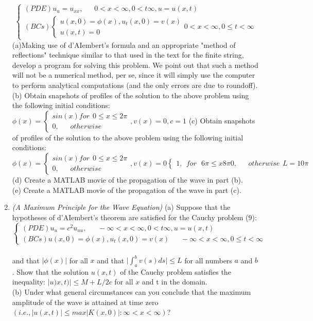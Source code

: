 \documentclass[../main.tex]{subfiles}
\begin{document}
\begin{enumerate}
$$\begin{cases} 
	(PDE) u_u=u_{xx}, ~~~~~~~ 0< x< \infty, 0<t \infty , u=u(x,t) \\ 
	(BCs)
	\begin{cases} 
	u(x,0)=\phi (x), u_t(x,0)=v(x)\\
	u(x,t)=0
	\end{cases}
	0<x<\infty, 0\leqslant t< \infty 
\end{cases}$$
(a)Making use of d'AIembert's formula and an appropriate "method of reflections" technique 
similar to that used in the text for the finite string, develop a program for solving this problem. 
We point out that such a method will not be a numerical method, per se, since it will simply use 
the computer to perform analytical computations (and the only errors are due to roundoff). 
\\
(b) Obtain snapshots of profiles of the solution to the above problem using the following initial conditions:
$\phi(x)=
\begin{cases}
	sin(x) for~~ 0\leqslant x \leqslant2 \pi\\
	0, ~~~~~~~otherwise
\end{cases},
	v(x)=0, c=1$
(c) Obtain snapshots of profiles of the solution to the above problem using the following initial 
conditions:
$$\phi(x)=
\begin{cases}
	sin(x) for~~ 0\leqslant x \leqslant2 \pi\\
	0, ~~~~~~~otherwise
\end{cases},
	v(x)=0
	 \begin{cases}
	 	1,~~for ~~~6\pi \leqslant x 8\pi
	 	0,~~~~~~~otherwise
	 \end{cases}
	 	L=10\pi$$
(d) Create a MATLAB movie of the propagation of the wave in part (b). 
\\
(e) Create a MATLAB movie of the propagation of the wave in part (c).
\\
	\item
		\textit{(A Maximum Principle for the Wave Equation)} (a) Suppose that the hypotheses of d'AIembert's 
theorem are satisfied for the Cauchy problem (9): 
$$\begin{cases} 
	(PDE) u_u=c^2 u_{uu}, ~~~~~~~ - \infty< x< \infty, 0<t \infty , u=u(x,t) \\ 
	(BCs) u(x,0)=\phi (x), u_t(x,0)=v(x) ~~~~~~~
	-\infty< x< \infty, 0\leqslant t< \infty
\end{cases}$$
\\
and that $\vert \phi(x) \vert$  for all $x$ and that $\vert \int_{a}^{b} v(s)ds \vert \leqslant L$ for all numbers $a$ and $b$. Show that the solution $u(x,t)$ of the Cauchy problem satisfies the inequality: $\vert u)x,t) \vert \leqslant M+L/2c$  for all $x$ and t in the domain. 
\\
(b) Under what general circumstances can you conclude that the maximum amplitude of the wave is attained at time zero
$(i.e., \vert u(x,t)\vert \leqslant max{\vert K(x,0) \vert: \infty < x < \infty} )$?
\end{enumerate}
\end{document}
